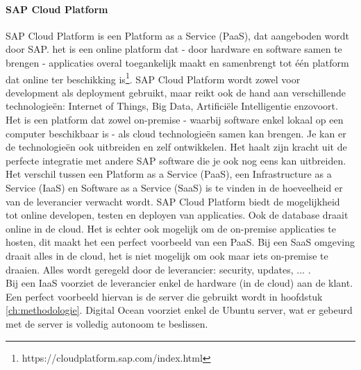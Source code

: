     \paragraph{SAP Cloud Platform}
    SAP Cloud Platform is een Platform as a Service (PaaS), dat aangeboden wordt door SAP. het is een online platform dat - door hardware en software samen te brengen - applicaties overal toegankelijk maakt en samenbrengt tot één platform dat online ter beschikking is\footnote{https://cloudplatform.sap.com/index.html}.
    SAP Cloud Platform wordt zowel voor development als deployment gebruikt, maar reikt ook de hand aan verschillende technologieën: Internet of Things, Big Data, Artificiële Intelligentie enzovoort. Het is een platform dat zowel on-premise - waarbij software enkel lokaal op een computer beschikbaar is - als cloud technologieën samen kan brengen. Je kan er de technologieën ook uitbreiden en zelf ontwikkelen. Het haalt zijn kracht uit de perfecte integratie met andere SAP software die je ook nog eens kan uitbreiden.\\
    Het verschil tussen een Platform as a Service (PaaS), een Infrastructure as a Service (IaaS) en Software as a Service (SaaS) is te vinden in de hoeveelheid er van de leverancier verwacht wordt. SAP Cloud Platform biedt de mogelijkheid tot online developen, testen en deployen van applicaties. Ook de database draait online in de cloud. Het is echter ook mogelijk om de on-premise applicaties te hosten, dit maakt het een perfect voorbeeld van een PaaS. Bij een SaaS omgeving draait alles in de cloud, het is niet mogelijk om ook maar iets on-premise te draaien. Alles wordt geregeld door de leverancier: security, updates, ... .\\
    Bij een IaaS voorziet de leverancier enkel de hardware (in de cloud) aan de klant. Een perfect voorbeeld hiervan is de server die gebruikt wordt in hoofdstuk \ref{ch:methodologie}. Digital Ocean voorziet enkel de Ubuntu server, wat er gebeurd met de server is volledig autonoom te beslissen.
    

